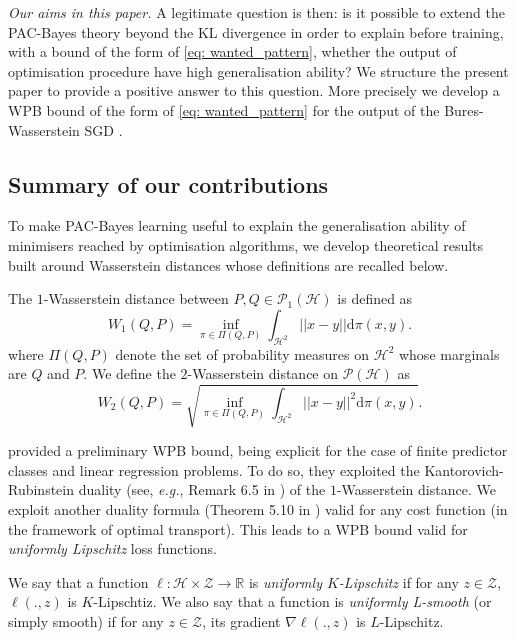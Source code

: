 \textit{Our aims in this paper.}
A legitimate question is then: is it possible to extend the PAC-Bayes theory beyond the KL divergence in order to explain before training, with a bound of the form of \eqref{eq: wanted_pattern}, whether the output of optimisation procedure have high generalisation ability? We structure the present paper to provide a positive answer to this question. More precisely we develop a WPB bound of the form of \eqref{eq: wanted_pattern} for the output of the Bures-Wasserstein SGD \citep{lambert2022variational}.



\subsection{Summary of our contributions}
\label{sec: intro_contrib}
To make PAC-Bayes learning useful to explain the generalisation ability of minimisers reached by optimisation algorithms, we develop theoretical results built around Wasserstein distances whose definitions are recalled below.

\begin{definition}
\label{def: wasserstein}
The $1$-Wasserstein distance between $P,Q \in \mathcal{P}_1(\mathcal{H})$ is defined as
\[ W_1(Q,P) = \inf_{\pi \in \Pi(Q,P)} \int_{\mathcal{H}^2} ||x-y||\mathrm{d}\pi(x,y). \]
where $\Pi(Q,P)$ denote the set of probability measures on $\mathcal{H}^2$ whose marginals are $Q$ and $P$.
We define the $2$-Wasserstein distance on $\mathcal{P}(\mathcal{H})$ as
\[ W_2(Q,P) = \sqrt{\inf_{\pi \in \Pi(Q,P)} \int_{\mathcal{H}^2} ||x-y||^2\mathrm{d}\pi(x,y)}. \]
\end{definition}
\citet{amit2022integral} provided a preliminary WPB bound, being explicit for the case of finite predictor classes and linear regression problems. To do so, they exploited the Kantorovich-Rubinstein duality (see, \emph{e.g.}, Remark 6.5 in \citealp{villani2009optimal}) of the $1$-Wasserstein distance. We exploit another duality formula (Theorem 5.10 in \citealp{villani2009optimal}) valid for any cost function (in the framework of optimal transport). This leads to a WPB bound valid for \emph{uniformly Lipschitz} loss functions.
\begin{definition}
\label{def: unif_lpz}
We say that a function $\ell:\mathcal{H}\times\mathcal{Z}\rightarrow \mathbb{R}$ is \emph{uniformly $K$-Lipschitz} if for any $z\in\mathcal{Z}$, $\ell(.,z)$ is $K$-Lipschtiz. We also say that a function is \emph{uniformly L-smooth} (or simply smooth) if for any $z\in\mathcal{Z}$, its gradient $\nabla \ell(.,z)$ is $L$-Lipschitz.
\end{definition}

